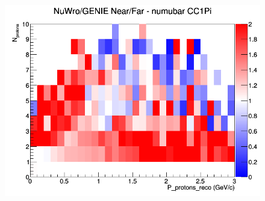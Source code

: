 \begin{figure}[h]
\endminipage
{}
\includegraphics[width=\linewidth]{eff_N_P/FGT/protons/ratios/CC1Pi_NuWro_GENIE_numubar_NF_N_P.png}
\endminipage
\newline
\end{figure}
\clearpage
